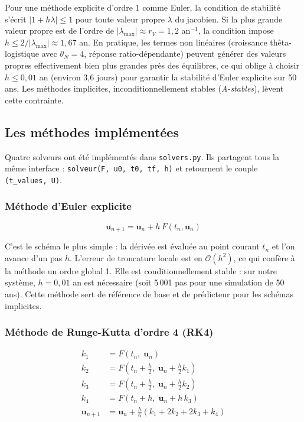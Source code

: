\documentclass[12pt,a4paper]{article}
\begin{document}
Pour une méthode explicite d'ordre 1 comme Euler, la condition de stabilité s'écrit
$|1 + h\lambda| \leq 1$ pour toute valeur propre $\lambda$ du jacobien. Si la plus grande
valeur propre est de l'ordre de $|\lambda_{\max}| \approx r_V = 1{,}2$ an$^{-1}$, la
condition impose $h \leq 2/|\lambda_{\max}| \approx 1{,}67$ an. En pratique, les termes non
linéaires (croissance thêta-logistique avec $\theta_N = 4$, réponse ratio-dépendante)
peuvent générer des valeurs propres effectivement bien plus grandes près des équilibres,
ce qui oblige à choisir $h \leq 0{,}01$ an (environ 3,6 jours) pour garantir la stabilité
d'Euler explicite sur 50 ans. Les méthodes implicites, inconditionnellement stables
(\emph{A-stables}), lèvent cette contrainte.

\subsection{Les méthodes implémentées}

Quatre solveurs ont été implémentés dans \texttt{solvers.py}. Ils partagent tous la même
interface : \texttt{solveur(F, u0, t0, tf, h)} et retournent le couple
\texttt{(t\_values, U)}.

\subsubsection{Méthode d'Euler explicite}

\[
\mathbf{u}_{n+1} = \mathbf{u}_n + h\, F(t_n, \mathbf{u}_n)
\]

C'est le schéma le plus simple : la dérivée est évaluée au point courant $t_n$ et l'on
avance d'un pas $h$. L'erreur de troncature locale est en $\mathcal{O}(h^2)$, ce qui
confère à la méthode un ordre global 1. Elle est conditionnellement stable : sur notre
système, $h = 0{,}01$ an est nécessaire (soit 5\,001 pas pour une simulation de 50 ans).
Cette méthode sert de référence de base et de prédicteur pour les schémas implicites.

\subsubsection{Méthode de Runge-Kutta d'ordre 4 (RK4)}

\[
\begin{aligned}
k_1 &= F(t_n,\; \mathbf{u}_n) \\
k_2 &= F\!\left(t_n + \tfrac{h}{2},\; \mathbf{u}_n + \tfrac{h}{2} k_1\right) \\
k_3 &= F\!\left(t_n + \tfrac{h}{2},\; \mathbf{u}_n + \tfrac{h}{2} k_2\right) \\
k_4 &= F(t_n + h,\; \mathbf{u}_n + h\, k_3) \\[4pt]
\mathbf{u}_{n+1} &= \mathbf{u}_n + \frac{h}{6}(k_1 + 2k_2 + 2k_3 + k_4)
\end{aligned}
\]
\end{document}
